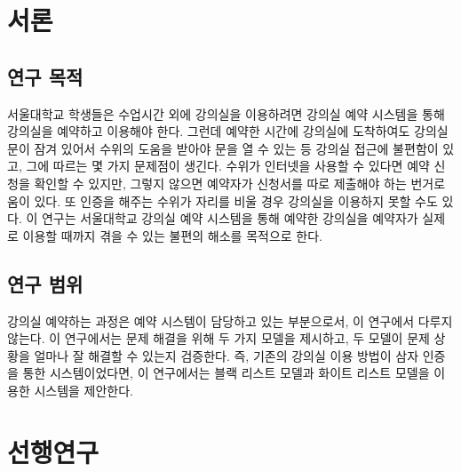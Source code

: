 \documentclass[11pt,a4paper]{article}
\begin{document}
\section{서론}

\subsection{연구 목적}
서울대학교 학생들은 수업시간 외에 강의실을 이용하려면 강의실 예약 시스템을 통해 강의실을 예약하고 이용해야 한다. 그런데 예약한 시간에 강의실에 도착하여도 강의실 문이 잠겨 있어서 수위의 도움을 받아야 문을 열 수 있는 등 강의실 접근에 불편함이 있고, 그에 따르는 몇 가지 문제점이 생긴다. 수위가 인터넷을 사용할 수 있다면 예약 신청을 확인할 수 있지만, 그렇지 않으면 예약자가 신청서를 따로 제출해야 하는 번거로움이 있다. 또 인증을 해주는 수위가 자리를 비울 경우 강의실을 이용하지 못할 수도 있다. 이 연구는 서울대학교 강의실 예약 시스템을 통해 예약한 강의실을 예약자가 실제로 이용할 때까지 겪을 수 있는 불편의 해소를 목적으로 한다.

\subsection{연구 범위}
강의실 예약하는 과정은 예약 시스템이 담당하고 있는 부분으로서, 이 연구에서 다루지 않는다. 이 연구에서는 문제 해결을 위해 두 가지 모델을 제시하고, 두 모델이 문제 상황을 얼마나 잘 해결할 수 있는지 검증한다. 즉, 기존의 강의실 이용 방법이 삼자 인증을 통한 시스템이었다면, 이 연구에서는 블랙 리스트 모델과 화이트 리스트 모델을 이용한 시스템을 제안한다.

\section{선행연구}
\end{document}
